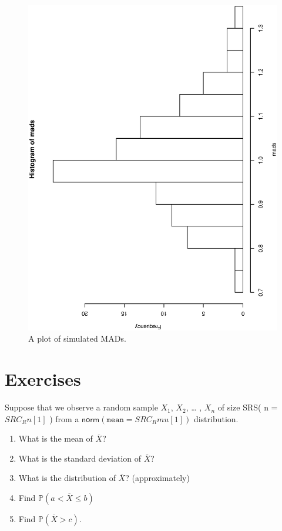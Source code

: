 \documentclass[captions=tableheading]{scrbook}
\begin{document}
\begin{figure}[th]
  \includegraphics[angle=270, totalheight=4in]{ps/sampdist/simulated-MAD.ps}
  \caption[Plot of simulated MADs]{\small A plot of simulated MADs.}
  \label{fig-simulated-MAD}
\end{figure}


\newpage{}
\section{Exercises}
\label{sec-8-6}

\setcounter{thm}{0}



\begin{xca}
Suppose that we observe a random sample \(X_{1}\), \(X_{2}\), \ldots{} , \(X_{n}\) of size SRS( n =  \(SRC_R{n[1]}\) ) from a \( \mathsf{norm}(\mathtt{mean}= SRC_R{mu[1]} ) \) distribution. 
\begin{enumerate}
\item What is the mean of \(\overline{X}\)?
\item What is the standard deviation of \(\overline{X}\)?
\item What is the distribution of \(\overline{X}\)? (approximately)
\item Find \(\mathbb{P}(a< \overline{X} \leq b)\)
\item Find \(\mathbb{P}(\overline{X} > c)\).
\end{enumerate}

\end{xca}
\end{document}

